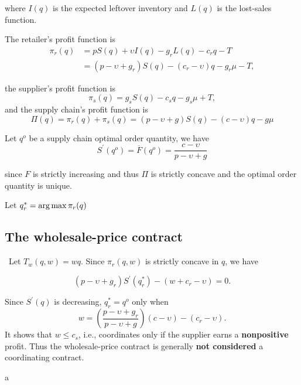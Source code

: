 where $I(q)$ is the expected leftover inventory and $L(q)$ is the lost-sales function.

The retailer's profit function is 
\begin{align*}
    \pi_r(q)&=pS(q)+\upsilon I(q)-g_r L(q)-c_r q - T\\
    &=(p-\upsilon+g_r)S(q)-(c_r-\upsilon)q-g_r\mu-T,
\end{align*}

the supplier's profit function is 
\begin{equation*}
    \pi_s(q)=g_s S(q)-c_s q-g_s\mu + T,
\end{equation*}
and the supply chain's profit function is 
\begin{equation}
    \Pi(q)=\pi_r(q)+\pi_s(q)=(p-\upsilon+g)S(q)-(c-\upsilon)q-g\mu
\end{equation}

Let $q^o$ be a supply chain optimal order quantity, we have 
\begin{equation}
    S^\prime(q^o)=\overline F(q^o)=\frac{c-\upsilon}{p-\upsilon+g}
\end{equation}

since $F$ is strictly increasing and thus $\Pi$ is strictly concave and the optimal order quantity is unique.

Let $q_r^*=\operatorname*{arg\,max} \pi_r(q)$

\subsection{The wholesale-price contract}\
Let $T_w(q,w)=w q$. Since $\pi_r(q,w)$ is strictly concave in $q$, we have 

\begin{equation}
    (p-\upsilon+g_r)S^\prime(q_r^*)-(w+c_r-\upsilon)=0.
\end{equation}

Since $S^\prime(q)$ is decreasing, $q_r^*=q^o$ only when
$$
w=(\frac{p-\upsilon+g_r}{p-\upsilon+g})(c-\upsilon)-(c_r-\upsilon).
$$
It shows that $w\leq c_s$, i.e., coordinates only if the supplier earns a \textbf{nonpositive} profit. Thus the wholesale-price contract is generally \textbf{not considered} a coordinating contract.



a







   